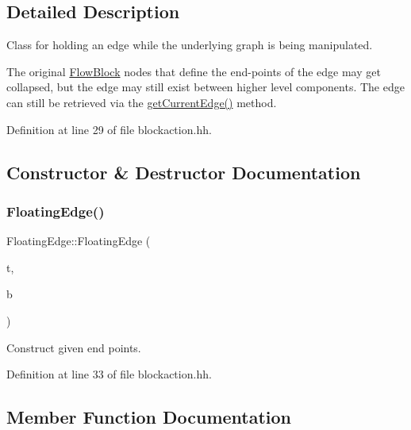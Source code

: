 \subsection{Detailed Description}
Class for holding an edge while the underlying graph is being manipulated. 

The original \mbox{\hyperlink{class_flow_block}{Flow\+Block}} nodes that define the end-\/points of the edge may get collapsed, but the edge may still exist between higher level components. The edge can still be retrieved via the \mbox{\hyperlink{class_floating_edge_afe06b54ef60e438326f48f0d466df0ff}{get\+Current\+Edge()}} method. 

Definition at line 29 of file blockaction.\+hh.



\subsection{Constructor \& Destructor Documentation}
\mbox{\label{class_floating_edge_a72ad665c68c1308a110a1a84903b760e}} 
\subsubsection{\texorpdfstring{FloatingEdge()}{FloatingEdge()}}
{\footnotesize\ttfamily Floating\+Edge\+::\+Floating\+Edge (\begin{DoxyParamCaption}\item[{\mbox{\hyperlink{class_flow_block}{Flow\+Block}} $\ast$}]{t,  }\item[{\mbox{\hyperlink{class_flow_block}{Flow\+Block}} $\ast$}]{b }\end{DoxyParamCaption})\hspace{0.3cm}{\ttfamily [inline]}}



Construct given end points. 



Definition at line 33 of file blockaction.\+hh.



\subsection{Member Function Documentation}
\mbox{\label{class_floating_edge_ad9c70dbd864a8391b1ceb01d2d60ca68}} 
